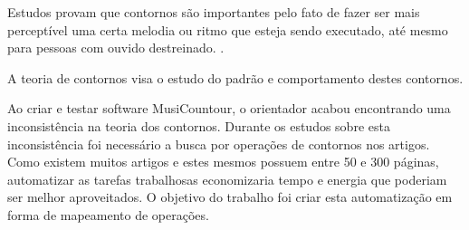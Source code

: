 \documentclass[11pt]{article}
\begin{document}

Estudos provam que contornos são importantes pelo fato de fazer ser
mais perceptível uma certa melodia ou ritmo que esteja sendo
executado, até mesmo para pessoas com ouvido destreinado.
\cite[p. 225]{Marvin1987}.

A teoria de contornos visa o estudo do padrão e comportamento destes contornos.








Ao criar e testar software MusiCountour, o orientador acabou encontrando uma inconsistência
na teoria dos contornos. Durante os estudos sobre esta inconsistência foi necessário a busca 
por operações de contornos nos artigos. Como existem muitos artigos e estes mesmos possuem 
entre 50 e 300 páginas, automatizar as tarefas trabalhosas economizaria tempo e energia 
que poderiam ser melhor aproveitados. O objetivo do trabalho foi criar esta automatização 
em forma de mapeamento de operações.
\end{document}
